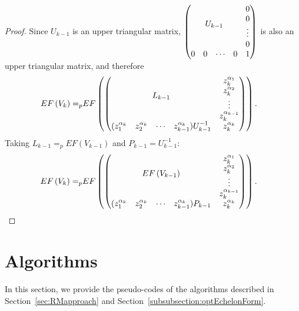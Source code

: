 \documentclass[11pt]{llncs}
\begin{document}
\begin{proof}
    
    Since $U_{k-1}$ is an upper triangular matrix, $ \begin{pmatrix}
            \multicolumn{4}{c}{\multirow{4}{*}{$U_{k-1}$}} & 0\\
            & & & & 0\\
            & & & & \vdots\\
            & & & & 0\\
            0 & 0& \cdots & 0 & 1
        \end{pmatrix}$ is also an upper triangular matrix, and therefore
\vspace{-0.2cm}
      \begin{align*}
        EF\left(V_{k}\right) =_p & EF
        \begin{pmatrix}
        \begin{pmatrix}
            \multicolumn{4}{c}{\multirow{4}{*}{$L_{k-1}$}} & z_k^{\alpha_1}\\
            & & & & z_k^{\alpha_2}\\
            & & & & \vdots\\
            & & & & z_{k}^{\alpha_{k-1}}\\
            (z_1^{\alpha_{k}} & z_2^{\alpha_{k}}& \cdots & z_{k-1}^{\alpha_{k}})U_{k-1}^{-1} & z_{k}^{\alpha_k}
        \end{pmatrix}
        \end{pmatrix}.
    \end{align*}
    Taking $L_{k-1} =_p EF\left(V_{k-1}\right)$ and $P_{k-1} = U_{k-1}^{-1}$:
    \begin{align*}
        EF\left(V_{k}\right) =_p & EF
        \begin{pmatrix}
        \begin{pmatrix}
            \multicolumn{4}{c}{\multirow{4}{*}{$EF\left(V_{k-1}\right)$}} & z_k^{\alpha_1}\\
            & & & & z_k^{\alpha_2}\\
            & & & & \vdots\\
            & & & & z_{k}^{\alpha_{k-1}}\\
            (z_1^{\alpha_{k}} & z_2^{\alpha_{k}}& \cdots & z_{k-1}^{\alpha_{k}})P_{k-1} & z_{k}^{\alpha_k}
        \end{pmatrix}
        \end{pmatrix}.
    \end{align*}
\end{proof}

\section{Algorithms}\label{Appendix:algorithms}
In this section, we provide the pseudo-codes of the algorithms described in Section~\ref{sec:RMapproach} and Section~\ref{subsubsection:optEchelonForm}.
\end{document}
